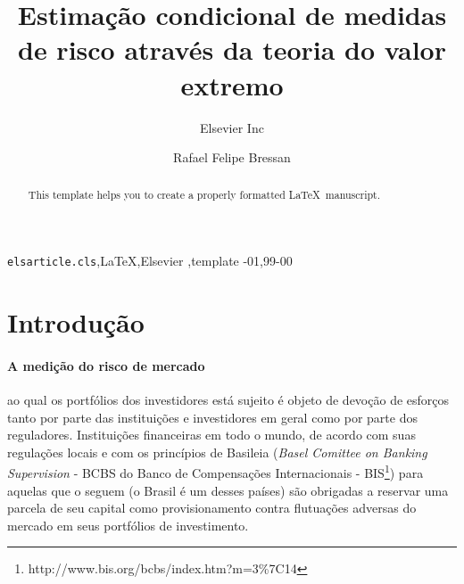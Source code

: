 \documentclass[review]{elsarticle}
\theoremstyle{definition}
\begin{document}
\begin{frontmatter}

\title{Estimação condicional de medidas de risco através da teoria do valor extremo}


\author[mymainaddress,mysecondaryaddress]{Elsevier Inc}

\author[mymainaddress]{Rafael Felipe Bressan}

\address[mymainaddress]{Avenida Madre Benvenuta, 2007 - Santa Mônica Florianópolis - SC 88035-901}
\address[mysecondaryaddress]{360 Park Avenue South, New York}

\begin{abstract}
This template helps you to create a properly formatted \LaTeX\ manuscript.
\end{abstract}

\begin{keyword}
\texttt{elsarticle.cls}\sep \LaTeX\sep Elsevier \sep template
-01\sep  99-00
\end{keyword}

\end{frontmatter}

\linenumbers

\section{Introdução}

\paragraph{A medição do risco de mercado} ao qual os portfólios dos investidores está sujeito é objeto de devoção de esforços tanto por parte das instituições e investidores em geral como por parte dos reguladores. Instituições financeiras em todo o mundo, de acordo com suas regulações locais e com os princípios de Basileia (\emph{Basel Comittee on Banking Supervision} - BCBS do Banco de Compensações Internacionais - BIS\footnote{http://www.bis.org/bcbs/index.htm?m=3\%7C14}) para aquelas que o seguem (o Brasil é um desses países)  são obrigadas a reservar uma parcela de seu capital como provisionamento contra flutuações adversas do mercado em seus portfólios de investimento.
\end{document}
